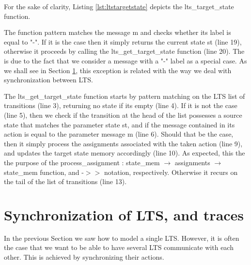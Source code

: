 		For the sake of clarity, Listing \ref{lst:ltstargetstate} depicts the \textsf{lts\_target\_state} function.	
	
					
	
	
	\noindent The function pattern matches the \textsf{message m} and checks whether its label
	is equal to \textsf{"-"}. If it is the case then it simply returns the current state \textsf{st} (line 19),
	otherwise it proceeds by calling the \textsf{lts\_get\_target\_state} function (line 20).
	The is due to the fact that we consider a \textsf{message} with a \textsf{"-"} label as
	a special case. As we shall see in Section \ref{sec:pnet}, this exception is related with the 
	way we deal with synchronization between \ac{LTS}.
	
	The \textsf{lts\_get\_target\_state} function starts by pattern matching on the \textsf{LTS}
	list of \textsf{transitions} (line 3),  returning no state if its empty (line 4). If it is not the 
	case (line 5), then we check if the \textsf{transition} at the head of the list possesses
	a source state that matches the parameter state \textsf{st}, and if the \textsf{message} contained
	in its \textsf{action} is equal to the parameter \textsf{message m} (line 6). Should that be the case,
	then it simply process the assignments associated with the taken \textsf{action} (line 9), and updates
	the target state memory accordingly (line 10). As expected, this the the purpose of the
	\textsf{process\_assignment : state\_mem $\rightarrow$ assignments $\rightarrow$ state\_mem} function, 
	and \textsf{-$>>$} notation, respectively. Otherwise it recurs on the tail of the list of 
	\textsf{transitions} (line 13).

	



\section{Synchronization of LTS, and traces}
\label{sec:pnet}

	In the previous Section we saw how to model a single \ac{LTS}. However, it is often the case
	that we want to be able to have several \ac{LTS} communicate with each other.	This is achieved
	by synchronizing their \textsf{actions}.
	
